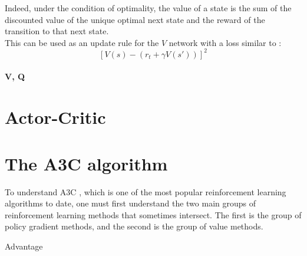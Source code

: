Indeed, under the condition of optimality, the value of a state is the sum of
the discounted value of the unique optimal next state and the reward of the 
transition to that next state.\\

This can be used as an update rule for the $V$ network with a loss similar to :
$$ \left[V(s) -  \left(r_t + \gamma V(s') \right)\right]^2 $$

\paragraph{V, Q}

\section{Actor-Critic}

\section{The A3C algorithm}
To understand A3C \cite{a3c}, which is one of the most popular reinforcement 
learning algorithms to date, one must first understand the two main groups of
reinforcement learning methods that sometimes intersect. The first is the 
group of policy gradient methods, and the second is the group of value 
methods.




Advantage

